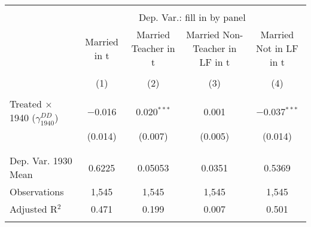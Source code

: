 
\begin{tabular}{@{\extracolsep{5pt}}lcccc} 
\\[-1.8ex]\hline 
\hline \\[-1.8ex] 
 & \multicolumn{4}{c}{Dep. Var.: fill in by panel} \\ 
\cline{2-5} 
 & Married in t & Married Teacher in t & Married Non-Teacher in LF in t & Married Not in LF in t \\ 
\\[-1.8ex] & (1) & (2) & (3) & (4)\\ 
\hline \\[-1.8ex] 
 Treated $\times$ 1940 ($\gamma_{1940}^{DD}$) & $-$0.016 & 0.020$^{***}$ & 0.001 & $-$0.037$^{***}$ \\ 
  & (0.014) & (0.007) & (0.005) & (0.014) \\ 
  & & & & \\ 
\hline \\[-1.8ex] 
Dep. Var. 1930 Mean & 0.6225 & 0.05053 & 0.0351 & 0.5369 \\ 
Observations & 1,545 & 1,545 & 1,545 & 1,545 \\ 
Adjusted R$^{2}$ & 0.471 & 0.199 & 0.007 & 0.501 \\ 
\hline 
\hline \\[-1.8ex] 
\end{tabular} 
